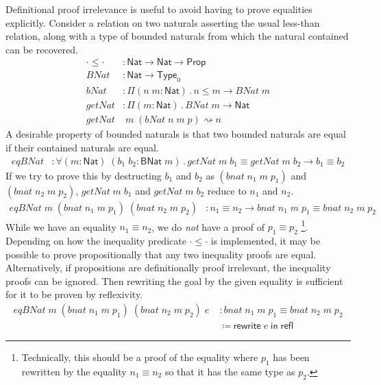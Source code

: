 \documentclass{article}
\newcommand{\kw}[1]{\mathsf{#1}}
\begin{document}
Definitional proof irrelevance is useful to avoid having to prove equalities explicitly.
Consider a relation on two naturals asserting the usual less-than relation,
along with a type of bounded naturals from which the natural contained can be recovered.
%
\begin{align*}
  \cdot \le \cdot &: \kw{Nat} \to \kw{Nat} \to \kw{Prop} \\
  \mathit{BNat} &: \kw{Nat} \to \kw{Type}_0 \\
  \mathit{bNat} &: \Pi (n \; m : \kw{Nat})\mathpunct{.} n \le m \to \mathit{BNat} \; m \\
  \mathit{getNat} &: \Pi (m : \kw{Nat})\mathpunct{.} \mathit{BNat} \; m \to \kw{Nat} \\
  \mathit{getNat} &\; m \; (\mathit{bNat} \; n \; m \; p) \rightsquigarrow n
\end{align*}
%
A desirable property of bounded naturals is that
two bounded naturals are equal if their contained naturals are equal.
%
\begin{align*}
  \mathit{eqBNat} &: \forall (m : \kw{Nat}) \; (b_1 \; b_2 : \kw{BNat} \; m) \mathpunct{.}
    \mathit{getNat} \; m \; b_1 \equiv \mathit{getNat} \; m \; b_2 \to b_1 \equiv b_2
\end{align*}
%
If we try to prove this by destructing $b_1$ and $b_2$ as
$(\mathit{bnat} \; n_1 \; m \; p_1)$ and $(\mathit{bnat} \; n_2 \; m \; p_2)$,
$\mathit{getNat} \; m \; b_1$ and $\mathit{getNat} \; m \; b_2$ reduce to $n_1$ and $n_2$.
%
\begin{align*}
  \mathit{eqBNat} \; m \; (\mathit{bnat} \; n_1 \; m \; p_1) \; (\mathit{bnat} \; n_2 \; m \; p_2)
    &: n_1 \equiv n_2 \to \mathit{bnat} \; n_1 \; m \; p_1 \equiv \mathit{bnat} \; n_2 \; m \; p_2
\end{align*}
%
While we have an equality $n_1 \equiv n_2$,
we do \emph{not} have a proof of $p_1 \equiv p_2$%
\footnote{Technically, this should be a proof of the equality
where $p_1$ has been rewritten by the equality $n_1 \equiv n_2$
so that it has the same type as $p_2$.}.
Depending on how the inequality predicate $\cdot \le \cdot$ is implemented,
it may be possible to prove propositionally that any two inequality proofs are equal.
Alternatively, if propositions are definitionally proof irrelevant,
the inequality proofs can be ignored.
Then rewriting the goal by the given equality is sufficient
for it to be proven by reflexivity.
%
\begin{align*}
  \mathit{eqBNat} \; m \; (\mathit{bnat} \; n_1 \; m \; p_1) \; (\mathit{bnat} \; n_2 \; m \; p_2) \; e \;
    &: \mathit{bnat} \; n_1 \; m \; p_1 \equiv \mathit{bnat} \; n_2 \; m \; p_2 \\
    &\coloneqq \kw{rewrite} \; e \; \kw{in} \; \kw{refl}
\end{align*}
\end{document}
